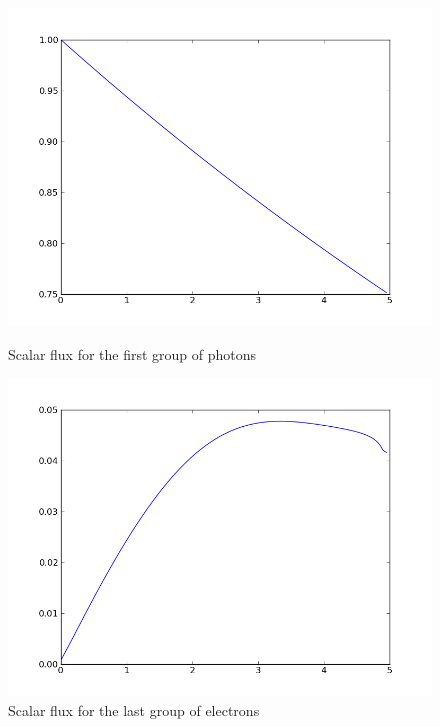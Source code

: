 \begin{figure}[H]
\begin{minipage}[b]{0.45\linewidth}
\centering
\includegraphics[width=\linewidth]{./images/al/group_0_moment_0}
\caption{Scalar flux for the first group of photons}
\end{minipage}
\hspace{0.5cm}
\begin{minipage}[b]{0.45\linewidth}
\centering
\includegraphics[width=\linewidth]{./images/al/group_39_moment_0}
\caption{Scalar flux for the last group of electrons}
\end{minipage}
\end{figure}

